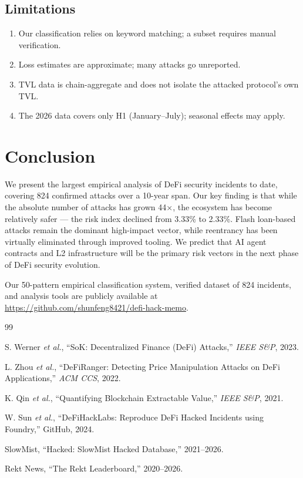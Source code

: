 \documentclass[10pt,conference]{IEEEtran}
\begin{document}
\subsection{Limitations}
\begin{enumerate}
  \item Our classification relies on keyword matching; a subset requires manual verification.
  \item Loss estimates are approximate; many attacks go unreported.
  \item TVL data is chain-aggregate and does not isolate the attacked protocol's own TVL.
  \item The 2026 data covers only H1 (January–July); seasonal effects may apply.
\end{enumerate}

\section{Conclusion}
We present the largest empirical analysis of DeFi security incidents to date, covering 824 confirmed attacks over a 10-year span. Our key finding is that while the absolute number of attacks has grown 44×, the ecosystem has become relatively safer — the risk index declined from 3.33\% to 2.33\%. Flash loan-based attacks remain the dominant high-impact vector, while reentrancy has been virtually eliminated through improved tooling. We predict that AI agent contracts and L2 infrastructure will be the primary risk vectors in the next phase of DeFi security evolution.

Our 50-pattern empirical classification system, verified dataset of 824 incidents, and analysis tools are publicly available at \url{https://github.com/shunfeng8421/defi-hack-memo}.


\begin{thebibliography}{99}

S. Werner \emph{et al.}, ``SoK: Decentralized Finance (DeFi) Attacks,'' \emph{IEEE S\&P}, 2023.

L. Zhou \emph{et al.}, ``DeFiRanger: Detecting Price Manipulation Attacks on DeFi Applications,'' \emph{ACM CCS}, 2022.

K. Qin \emph{et al.}, ``Quantifying Blockchain Extractable Value,'' \emph{IEEE S\&P}, 2021.

W. Sun \emph{et al.}, ``DeFiHackLabs: Reproduce DeFi Hacked Incidents using Foundry,'' GitHub, 2024.

SlowMist, ``Hacked: SlowMist Hacked Database,'' 2021--2026.

Rekt News, ``The Rekt Leaderboard,'' 2020--2026.

\end{thebibliography}
\end{document}
